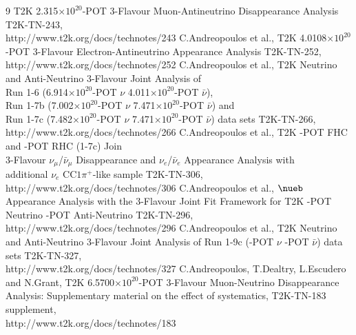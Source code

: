 \begin{thebibliography}{9}
   T2K 2.315$\times10^{20}$-POT 3-Flavour Muon-Antineutrino Disappearance Analysis
   T2K-TN-243,\\
   http://www.t2k.org/docs/technotes/243
   C.Andreopoulos et al.,
   T2K 4.0108$\times10^{20}$-POT 3-Flavour Electron-Antineutrino Appearance Analysis
   T2K-TN-252,\\
   http://www.t2k.org/docs/technotes/252
   C.Andreopoulos et al.,
   T2K Neutrino and Anti-Neutrino 3-Flavour Joint Analysis of  \\
   Run 1-6  (6.914$\times10^{20}$-POT $\nu$ 4.011$\times10^{20}$-POT $\bar{\nu}$), \\
   Run 1-7b (7.002$\times10^{20}$-POT $\nu$ 7.471$\times10^{20}$-POT $\bar{\nu}$) and \\
   Run 1-7c (7.482$\times10^{20}$-POT $\nu$ 7.471$\times10^{20}$-POT $\bar{\nu}$)
   data sets
   T2K-TN-266,\\
   http://www.t2k.org/docs/technotes/266
   C.Andreopoulos et al.,
   T2K \TotalPotNuRunOneSevenC-POT FHC and \TotalPotNuBarRunOneSevenC-POT RHC (1-7c) Join \\
   3-Flavour $\nu_\mu$/$\bar{\nu}_\mu$ Disappearance and $\nu_e$/$\bar{\nu}_e$ Appearance Analysis with \\
   additional $\nu_e$ CC$1\pi^{+}$-like sample
   T2K-TN-306,\\
   http://www.t2k.org/docs/technotes/306
	C.Andreopoulos et al.,
	$\nueb$ Appearance Analysis with the 3-Flavour Joint Fit Framework for T2K \TotalPotNuRunOneSix-POT Neutrino \TotalPotNuBarRunOneSix-POT Anti-Neutrino
	T2K-TN-296,\\
	http://www.t2k.org/docs/technotes/296
	C.Andreopoulos et al.,
	T2K Neutrino and Anti-Neutrino 3-Flavour Joint Analysis of Run 1-9c (\TotalPotNuRunOneNineC-POT $\nu$ \TotalPotNuBarRunOneNineC-POT $\bar{\nu}$) data sets
	T2K-TN-327,\\
	http://www.t2k.org/docs/technotes/327	
%
%
  C.Andreopoulos, T.Dealtry, L.Escudero and N.Grant,
  T2K 6.5700$\times10^{20}$-POT 3-Flavour Muon-Neutrino Disappearance Analysis:
  Supplementary material on the effect of systematics,
  T2K-TN-183 supplement,\\
  http://www.t2k.org/docs/technotes/183


\end{thebibliography}
